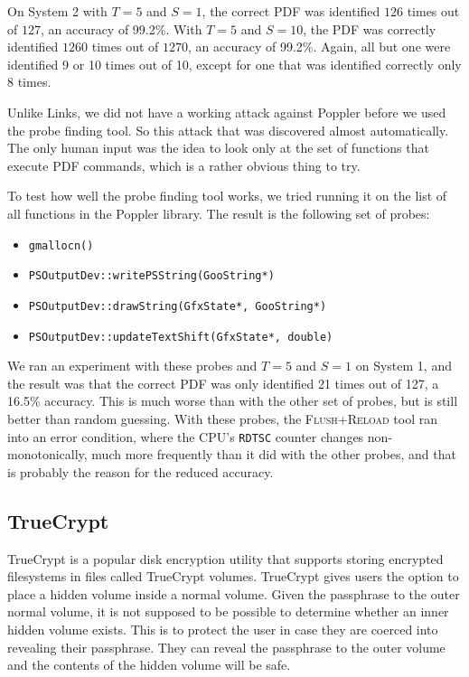 \documentclass[letterpaper,twocolumn,10pt]{article}
\begin{document}
On System 2 with $T=5$ and $S=1$, the correct PDF was
identified $126$ times out of $127$, an accuracy of 99.2\%. With $T=5$ and
$S=10$, the PDF was correctly identified $1260$ times out
of $1270$, an accuracy of 99.2\%. Again, all but one were identified 9 or 10
times out of 10, except for one that was identified correctly only 8 times.

Unlike Links, we did not have a working attack against Poppler before we used
the probe finding tool. So this attack that was discovered almost automatically.
The only human input was the idea to look only at the set of functions that
execute PDF commands, which is a rather obvious thing to try.

To test how well the probe finding tool works, we tried running it on the list
of all functions in the Poppler library. The result is the following set of
probes:

\begin{itemize}
    \item \texttt{gmallocn()}
    \item \texttt{PSOutputDev::writePSString(GooString*)}
    \item \texttt{PSOutputDev::drawString(GfxState*, GooString*)}
    \item \texttt{PSOutputDev::updateTextShift(GfxState*, double)}
\end{itemize}

We ran an experiment with these probes and $T=5$ and $S=1$
on System 1, and the result was that the correct PDF was only identified 21
times out of 127, a 16.5\% accuracy. This is much worse than with the other set
of probes, but is still better than random guessing. With these probes, the
\textsc{Flush+Reload} tool ran into an error condition, where the CPU's
\texttt{RDTSC} counter changes non-monotonically, much more frequently than it
did with the other probes, and that is probably the reason for the reduced
accuracy.

\subsection{TrueCrypt}

TrueCrypt is a popular disk encryption utility that supports storing encrypted
filesystems in files called TrueCrypt volumes. TrueCrypt gives users the option
to place a hidden volume inside a normal volume. Given the passphrase to the
outer normal volume, it is not supposed to be possible to determine whether an
inner hidden volume exists. This is to protect the user in case they are coerced
into revealing their passphrase. They can reveal the passphrase to the outer
volume and the contents of the hidden volume will be safe. 
\end{document}
